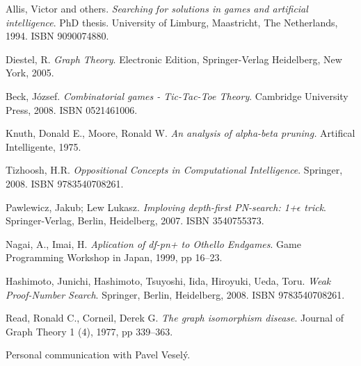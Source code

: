 
\def\bibname{Bibliography}
\begin{thebibliography}{99}
\addcontentsline{toc}{chapter}{\bibname}


  {\sc Allis,} Victor and others.
  \emph{Searching for solutions in games and artificial intelligence}.
  PhD thesis.
  University of Limburg, Maastricht, The Netherlands, 1994.
  ISBN 9090074880.

  {\sc Diestel,} R.
  \emph{Graph Theory}.
  Electronic Edition, Springer-Verlag Heidelberg, New York, 2005.

  {\sc Beck,} József.
  \emph{Combinatorial games - Tic-Tac-Toe Theory}.
  Cambridge University Press, 2008.
  ISBN 0521461006.

  {\sc Knuth,} Donald E., {\sc Moore,} Ronald W.
  \emph{An analysis of alpha-beta pruning.}
  Artifical Intelligente, 1975.

  {\sc Tizhoosh}, H.R.
  \emph{Oppositional Concepts in Computational Intelligence}.
  Springer, 2008.
  ISBN 9783540708261.

  {\sc Pawlewicz,} Jakub; {\sc Lew} Lukasz.
  \emph{Imploving depth-first PN-search: 1+$\epsilon$ trick}.
  Springer-Verlag, Berlin, Heidelberg, 2007.
  ISBN 3540755373.
   
  {\sc Nagai,} A., {\sc Imai,} H.
  \emph{Aplication of df-pn+ to Othello Endgames}.
  Game Programming Workshop in Japan, 1999, pp 16--23.

  {\sc Hashimoto,} Junichi, {\sc Hashimoto,} Tsuyoshi, {\sc Iida,} Hiroyuki, {\sc Ueda,} Toru.
  \emph{Weak Proof-Number Search}.
  Springer, Berlin, Heidelberg, 2008.
  ISBN 9783540708261.

  {\sc Read,} Ronald C., {\sc Corneil,} Derek G.
  \emph{The graph isomorphism disease}.
  Journal of Graph Theory 1 (4), 1977, pp 339--363.

  Personal communication with Pavel Veselý.

\end{thebibliography}
